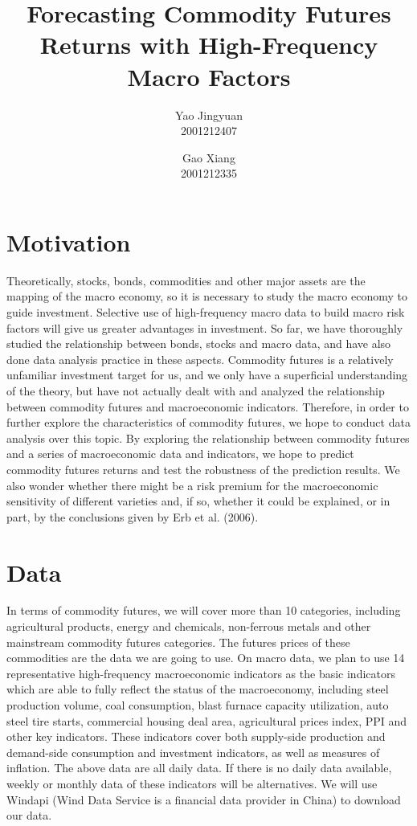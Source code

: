 \documentclass[11pt,en,cite=authoryear]{elegantpaper}
\title{Forecasting Commodity Futures Returns with High-Frequency Macro Factors}
\author{Yao Jingyuan \\ 2001212407 \and Gao Xiang \\ 2001212335}
\begin{document}
\maketitle



\section{Motivation}
Theoretically, stocks, bonds, commodities and other major assets are the mapping of the macro economy, so it is necessary to study the macro economy to guide investment. Selective use of high-frequency macro data to build macro risk factors will give us greater advantages in investment. So far, we have thoroughly studied the relationship between bonds, stocks and macro data, and have also done data analysis practice in these aspects. Commodity futures is a relatively unfamiliar investment target for us, and we only have a superficial understanding of the theory, but have not actually dealt with and analyzed the relationship between commodity futures and macroeconomic indicators. Therefore, in order to further explore the characteristics of commodity futures, we hope to conduct data analysis over this topic. By exploring the relationship between commodity futures and a series of macroeconomic data and indicators, we hope to predict commodity futures returns and test the robustness of the prediction results. We also wonder whether there might be a risk premium for the macroeconomic sensitivity of different varieties and, if so, whether it could be explained, or in part, by the conclusions given by Erb et al. (2006).

\section{Data}
In terms of commodity futures, we will cover more than 10 categories, 
including agricultural products, energy and chemicals, non-ferrous metals and other mainstream commodity futures categories. 
The futures prices of these commodities are the data we are going to use. 
On macro data, we plan to use 14 representative high-frequency macroeconomic indicators as the basic indicators which are able to fully reflect the status of the macroeconomy, 
including steel production volume, coal consumption, blast furnace capacity utilization, auto steel tire starts, 
commercial housing deal area, agricultural prices index, PPI and other key indicators. 
These indicators cover both supply-side production and demand-side consumption and investment indicators, 
as well as measures of inflation. The above data are all daily data. 
If there is no daily data available, weekly or monthly data of these indicators will be alternatives.
We will use Windapi (Wind Data Service is a financial data provider in China) to download our data.
\end{document}
